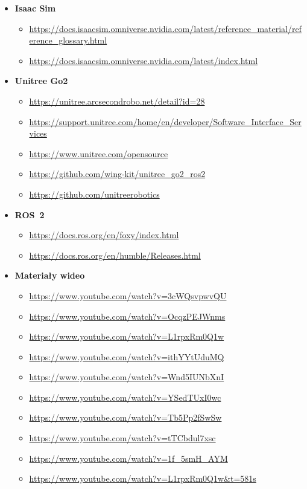 \documentclass[12pt]{article}
\begin{document}
\begin{itemize}
  \item \textbf{Isaac Sim}
  \begin{itemize}
    \item \url{https://docs.isaacsim.omniverse.nvidia.com/latest/reference_material/reference_glossary.html}
    \item \url{https://docs.isaacsim.omniverse.nvidia.com/latest/index.html}
  \end{itemize}

  \item \textbf{Unitree Go2}
  \begin{itemize}
    \item \url{https://unitree.arcsecondrobo.net/detail?id=28}
    \item \url{https://support.unitree.com/home/en/developer/Software_Interface_Services}
    \item \url{https://www.unitree.com/opensource}
    \item \url{https://github.com/wing-kit/unitree_go2_ros2}
    \item \url{https://github.com/unitreerobotics}
  \end{itemize}

  \item \textbf{ROS~2}
  \begin{itemize}
    \item \url{https://docs.ros.org/en/foxy/index.html}
    \item \url{https://docs.ros.org/en/humble/Releases.html}
  \end{itemize}

  \item \textbf{Materiały wideo}
  \begin{itemize}
    \item \url{https://www.youtube.com/watch?v=3cWQsvpwvQU}
    \item \url{https://www.youtube.com/watch?v=OcqzPEJWnms}
    \item \url{https://www.youtube.com/watch?v=L1rpxRm0Q1w}
    \item \url{https://www.youtube.com/watch?v=ithYYtUduMQ}
    \item \url{https://www.youtube.com/watch?v=Wnd5IUNbXnI}
    \item \url{https://www.youtube.com/watch?v=YSedTUxI0wc}
    \item \url{https://www.youtube.com/watch?v=Tb5Pp2fSwSw}
    \item \url{https://www.youtube.com/watch?v=tTCbdul7xsc}
    \item \url{https://www.youtube.com/watch?v=1f_5smH_AYM}
    \item \url{https://www.youtube.com/watch?v=L1rpxRm0Q1w&t=581s}
  \end{itemize}
\end{itemize}
\end{document}
